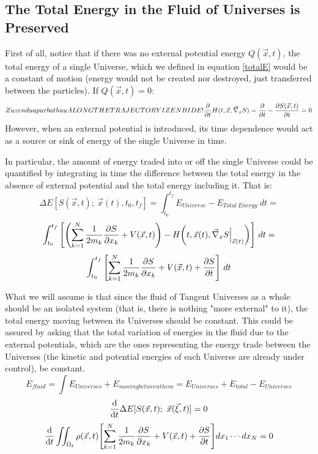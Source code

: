 \documentclass[11pt, a4paper]{article} %
\begin{document}
\subsection*{The Total Energy in the Fluid of Universes is Preserved}
First of all, notice that if there was no external potential energy $Q(\vec{x},t)$, the total energy of a single Universe, which we defined in equation \eqref{totalE} would be a constant of motion (energy would not be created nor destroyed, just transferred between the particles). If $Q(\vec{x},t)=0$:
\begin{equation}Zuzendu apur bat hau ALONG THE TRAJECTORY IZEN BIDE!
\pdv{}{t} H(t,\vec{x},\vec{\nabla}_x S)=\pdv{}{t}-\pdv{S(\vec{x},t)}{t}=0
\end{equation}
However, when an external potential is introduced, its time dependence would act as a source or sink of energy of the single Universe in time.

 In particular, the amount of energy traded into or off the single Universe could be quantified by integrating in time the difference between the total energy in the absence of external potential and the total energy including it. That is:
\begin{equation}
\Delta E [S(\vec{x},t);\ \vec{x}(t), t_0, t_f] = \int_{t_0}^{t_f} E_{Universe}-E_{Total\ Energy}\ dt=
\end{equation}
$$
\int_{t_0}^{t_f}\qty[ \qty(\sum_{k=1}^N \frac{1}{2m_k} \pdv{S}{x_k}+V(\vec{x},t))-H\qty(t, \vec{x}(t), \vec{\nabla}_x S\Big\rvert_{\vec{x}(t)}) ]\ dt = 
$$
$$
\int_{t_0}^{t_f}\qty[ \sum_{k=1}^N \frac{1}{2m_k} \pdv{S}{x_k}+V(\vec{x},t)+\pdv{S}{t} ]\ dt
$$

What we will assume is that since the fluid of Tangent Universes as a whole should be an isolated system (that is, there is nothing "more external" to it), the total energy moving between its Universes should be constant. This could be assured by asking that the total variation of energies in the fluid due to the external potentials, which are the ones representing the energy trade between the Universes (the kinetic and potential energies of each Universe are already under control), be constant.
$$
E_{fluid}=\int E_{Universes} + E_{moving between them}=E_{Universes} + E_{total}-E_{Universes}
$$
\begin{equation}
\dv{}{t}\Delta E [S(\vec{x},t);\ \vec{x}(\vec{\xi},t)]=0
\end{equation}
$$
\dv{}{t} \iint_{\Omega_t} \rho(\vec{x},t) \qty[ \sum_{k=1}^N \frac{1}{2m_k} \pdv{S}{x_k}+V(\vec{x},t)+\pdv{S}{t} ] dx_1\cdots dx_N = 0
$$
\end{document}
